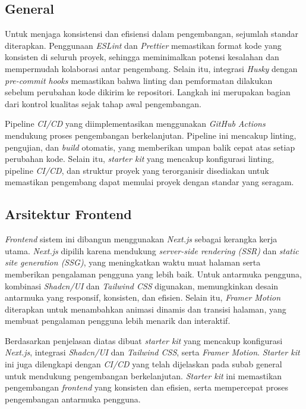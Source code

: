 \subsection{General}
Untuk menjaga konsistensi dan efisiensi dalam pengembangan, sejumlah standar diterapkan. Penggunaan \emph{ESLint} dan \emph{Prettier} memastikan format kode yang konsisten di seluruh proyek, sehingga meminimalkan potensi kesalahan dan mempermudah kolaborasi antar pengembang. Selain itu, integrasi \emph{Husky} dengan \emph{pre-commit hooks} memastikan bahwa linting dan pemformatan dilakukan sebelum perubahan kode dikirim ke repositori. Langkah ini merupakan bagian dari kontrol kualitas sejak tahap awal pengembangan.

Pipeline \emph{CI/CD} yang diimplementasikan menggunakan \emph{GitHub Actions} mendukung proses pengembangan berkelanjutan. Pipeline ini mencakup linting, pengujian, dan \emph{build} otomatis, yang memberikan umpan balik cepat atas setiap perubahan kode. Selain itu, \emph{starter kit} yang mencakup konfigurasi linting, pipeline \emph{CI/CD}, dan struktur proyek yang terorganisir disediakan untuk memastikan pengembang dapat memulai proyek dengan standar yang seragam.

\subsection{Arsitektur Frontend}
\emph{Frontend} sistem ini dibangun menggunakan \emph{Next.js} sebagai kerangka kerja utama. \emph{Next.js} dipilih karena mendukung \emph{server-side rendering (SSR)} dan \emph{static site generation (SSG)}, yang meningkatkan waktu muat halaman serta memberikan pengalaman pengguna yang lebih baik. Untuk antarmuka pengguna, kombinasi \emph{Shadcn/UI} dan \emph{Tailwind CSS} digunakan, memungkinkan desain antarmuka yang responsif, konsisten, dan efisien. Selain itu, \emph{Framer Motion} diterapkan untuk menambahkan animasi dinamis dan transisi halaman, yang membuat pengalaman pengguna lebih menarik dan interaktif. 

Berdasarkan penjelasan diatas dibuat \emph{starter kit} yang mencakup konfigurasi \emph{Next.js}, integrasi \emph{Shadcn/UI} dan \emph{Tailwind CSS}, serta \emph{Framer Motion}. \emph{Starter kit} ini juga dilengkapi dengan \emph{CI/CD} yang telah dijelaskan pada subab general untuk mendukung pengembangan berkelanjutan. \emph{Starter kit} ini memastikan pengembangan \emph{frontend} yang konsisten dan efisien, serta mempercepat proses pengembangan antarmuka pengguna.


